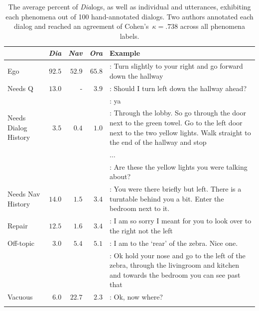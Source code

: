 \begin{table}[ht]
\centering
\begin{small}
\begin{tabular}{p{1.4cm}rrrp{8.5cm}}
    & \textbf{\textit{Dia}} & \textbf{\textit{Nav}} & \textbf{\textit{Ora}} & \textbf{Example} \\
    \toprule
    Ego & $92.5$ & $52.9$ & $65.8$ & \ora{}: Turn slightly to {\color{blue}your right} and go {\color{blue}forward} down the hallway \\
    \cmidrule{5-5}
    Needs Q & $13.0$ & - & $3.9$ & \nav{}: Should I turn left down the hallway ahead? \\
    & & & &  \ora{}: {\color{blue}ya} \\
    \cmidrule{5-5}
    Needs Dialog History & $3.5$ & $0.4$ & $1.0$ & \ora{}: Through the lobby. So go through the door next to the green towel. Go to the left door next to {\color{blue}the two yellow lights}. Walk straight to the end of the hallway and stop \\
    & & & & $\dots$ \\
    & & & & \nav{}: Are these {\color{blue}the yellow lights} you were talking about? \\
    \cmidrule{5-5}
    Needs Nav History & $14.0$ & $1.5$ & $3.4$ & \ora{}: {\color{blue}You were there briefly but left}. There is a turntable behind you a bit. Enter the bedroom next to it. \\
    \cmidrule{5-5}
    Repair & $12.5$ & $1.6$ & $3.4$ & \ora{}: I am so sorry {\color{blue}I meant for you to look over to the right not the left} \\
    \cmidrule{5-5}
    Off-topic & $3.0$ & $5.4$ & $5.1$ & \nav{}: I am to the `rear' of the zebra. {\color{blue}Nice one.} \\
    & & & & \ora{}: {\color{blue}Ok hold your nose} and go to the left of the zebra, through the livingroom and kitchen and towards the bedroom you can see past that \\
    \cmidrule{5-5}
    Vacuous & $6.0$ & $22.7$ & $2.3$ & \nav{}: {\color{blue}Ok, now where?} \\
    \bottomrule \\
\end{tabular}
\end{small}
\caption{
The average percent of \textit{Dia}logs, as well as individual \nav{} and \ora{} utterances, exhibiting each phenomena out of 100 hand-annotated dialogs.
Two authors annotated each dialog and reached an agreement of Cohen's~$\kappa=.738$ across all phenomena labels.
}
\vspace{-8mm}
\label{tab:analysis}
\end{table}

